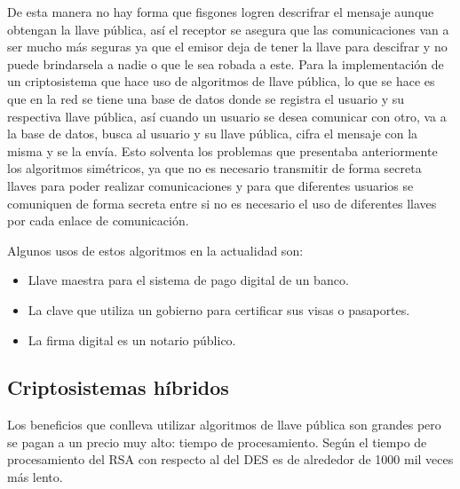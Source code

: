 De esta manera no hay forma que fisgones logren descrifrar el mensaje aunque obtengan la llave pública, así el receptor se asegura que las comunicaciones van a ser mucho más seguras ya que el emisor deja de tener la llave para descifrar y no puede brindarsela a nadie o que le sea robada a este. Para la implementación de un criptosistema que hace uso de algoritmos de llave pública, lo que se hace es que en la red se tiene una base de datos donde se registra el usuario y su respectiva llave pública, así cuando un usuario se desea comunicar con otro, va a la base de datos, busca al usuario y su llave pública, cifra el mensaje con la misma y se la envía. Esto solventa los problemas que presentaba anteriormente los algoritmos simétricos, ya que no es necesario transmitir de forma secreta llaves para poder realizar comunicaciones y para que diferentes usuarios se comuniquen de forma secreta entre si no es necesario el uso de diferentes llaves por cada enlace de comunicación. 

Algunos usos de estos algoritmos en la actualidad son:
\begin{itemize}
\item Llave maestra para el sistema de pago digital de un banco.
\item La clave que utiliza un gobierno para certificar sus visas o pasaportes.
\item La firma digital es un notario público.
\end{itemize} 

\subsection{Criptosistemas híbridos}
Los beneficios que conlleva utilizar algoritmos de llave pública son grandes pero se pagan a un precio muy alto: tiempo de procesamiento. Según \cite{bruce} el tiempo de procesamiento del RSA con respecto al del DES es de alrededor de 1000 mil veces más lento. 

